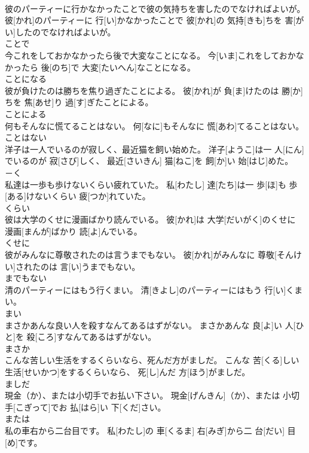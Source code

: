 \documentclass[8pt]{extreport}
\begin{document}
\begin{CJK}{UTF8}{min}
\\	彼のパーティーに行かなかったことで彼の気持ちを害したのでなければよいが。	彼[かれ]のパーティーに 行[い]かなかったことで 彼[かれ]の 気持[きも]ちを 害[がい]したのでなければよいが。	
\\	ことで	
\\	今これをしておかなかったら後で大変なことになる。	今[いま]これをしておかなかったら 後[のち]で 大変[たいへん]なことになる。	
\\	ことになる	
\\	彼が負けたのは勝ちを焦り過ぎたことによる。	彼[かれ]が 負[ま]けたのは 勝[か]ちを 焦[あせ]り 過[す]ぎたことによる。	
\\	ことによる	
\\	何もそんなに慌てることはない。	何[なに]もそんなに 慌[あわ]てることはない。	
\\	ことはない	
\\	洋子は一人でいるのが寂しく、最近猫を飼い始めた。	洋子[ようこ]は一 人[にん]でいるのが 寂[さび]しく、 最近[さいきん] 猫[ねこ]を 飼[か]い 始[はじ]めた。	
\\	－く	
\\	私達は一歩も歩けないくらい疲れていた。	私[わたし] 達[たち]は一 歩[ほ]も 歩[ある]けないくらい 疲[つか]れていた。	
\\	くらい	
\\	彼は大学のくせに漫画ばかり読んでいる。	彼[かれ]は 大学[だいがく]のくせに 漫画[まんが]ばかり 読[よ]んでいる。	
\\	くせに	
\\	彼がみんなに尊敬されたのは言うまでもない。	彼[かれ]がみんなに 尊敬[そんけい]されたのは 言[い]うまでもない。	
\\	までもない	
\\	清のパーティーにはもう行くまい。	清[きよし]のパーティーにはもう 行[い]くまい。	
\\	まい	
\\	まさかあんな良い人を殺すなんてあるはずがない。	まさかあんな 良[よ]い 人[ひと]を 殺[ころ]すなんてあるはずがない。	
\\	まさか	
\\	こんな苦しい生活をするくらいなら、死んだ方がましだ。	こんな 苦[くる]しい 生活[せいかつ]をするくらいなら、 死[し]んだ 方[ほう]がましだ。	
\\	ましだ	
\\	現金（か）、または小切手でお払い下さい。	現金[げんきん]（か）、または 小切手[こぎって]でお 払[はら]い 下[くだ]さい。	
\\	または	
\\	私の車右から二台目です。	私[わたし]の 車[くるま] 右[みぎ]から二 台[だい] 目[め]です。	

\end{CJK}
\end{document}
